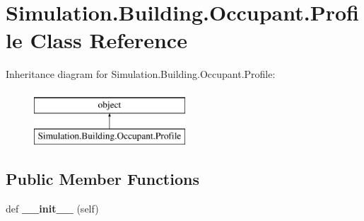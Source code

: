 \hypertarget{class_c_simulation_1_1_simulation_1_1_building_1_1_occupant_1_1_profile}{}\section{Simulation.\+Building.\+Occupant.\+Profile Class Reference}
\label{class_c_simulation_1_1_simulation_1_1_building_1_1_occupant_1_1_profile}
Inheritance diagram for Simulation.\+Building.\+Occupant.\+Profile\+:\begin{figure}[H]
\begin{center}
\leavevmode
\includegraphics[height=2.000000cm]{class_c_simulation_1_1_simulation_1_1_building_1_1_occupant_1_1_profile}
\end{center}
\end{figure}
\subsection*{Public Member Functions}
\begin{DoxyCompactItemize}
\item 
\mbox{\label{class_c_simulation_1_1_simulation_1_1_building_1_1_occupant_1_1_profile_ae64f0875afe3067b97ba370b354b9213}} 
def {\bfseries \+\_\+\+\_\+init\+\_\+\+\_\+} (self)
\end{DoxyCompactItemize}
